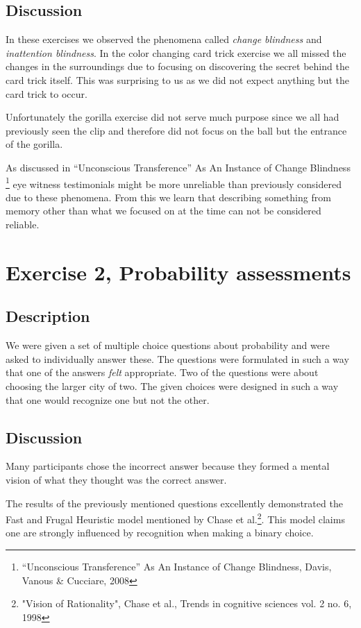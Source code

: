 \documentclass[10pt, a4paper]{article}
\begin{document}
\subsection{Discussion}
In these exercises we observed the phenomena called \emph{change blindness} and \emph{inattention blindness}. In the color changing card trick exercise we all missed the changes in the surroundings due to focusing on discovering the secret behind the card trick itself. This was surprising to us as we did not expect anything but the card trick to occur. 

Unfortunately the gorilla exercise did not serve much purpose since we all had previously seen the clip and therefore did not focus on the ball but the entrance of the gorilla. 

As discussed in “Unconscious Transference” As An Instance of Change Blindness \footnote{“Unconscious Transference” As An Instance of Change Blindness, Davis, Vanous \& Cucciare, 2008} eye witness testimonials might be more unreliable than previously considered due to these phenomena. From this we learn that describing something from memory other than what we focused on at the time can not be considered reliable. 

\section{Exercise 2, Probability assessments}
\subsection{Description}
We were given a set of multiple choice questions about probability and were asked to individually answer these. 
The questions were formulated in such a way that one of the answers \emph{felt} appropriate.
Two of the questions were about choosing the larger city of two. The given choices were designed in such a way that one would recognize one but not the other. 

\subsection{Discussion}
Many participants chose the incorrect answer because they formed a mental vision of what they thought was the correct answer. 

The results of the previously mentioned questions excellently demonstrated the Fast and Frugal Heuristic model mentioned by Chase et al.\footnote{"Vision of Rationality", Chase et al., Trends in cognitive sciences vol. 2 no. 6, 1998}. This model claims one are strongly influenced by recognition when making a binary choice. 
\end{document}
